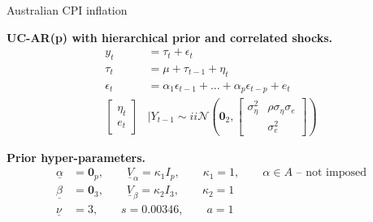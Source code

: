 \documentclass[notes,blackandwhite,mathsans,usenames,dvipsnames]{beamer}
\begin{document}
\begin{frame}{Australian CPI inflation}

\bigskip\textbf{UC-AR(p) with hierarchical prior and correlated shocks.}
\begin{align*}
y_t &= \tau_t + \epsilon_t\\[1ex]
\tau_t &= \mu + \tau_{t-1} + \eta_t\\[1ex]
\epsilon_t &= \alpha_1\epsilon_{t-1} + \dots + \alpha_p\epsilon_{t-p} +  e_t\\[2ex]
\begin{bmatrix}\eta_t \\ e_t\end{bmatrix}&\bigg|Y_{t-1} \sim ii\mathcal{N}\left(\mathbf{0}_2, \begin{bmatrix}\sigma_\eta^2 & \rho\sigma_\eta\sigma_e \\  & \sigma_e^2\end{bmatrix} \right)
\end{align*}

\smallskip\textbf{Prior hyper-parameters.}
\begin{align*}
\underline\alpha &= \mathbf{0}_p,  \qquad\underline{V}_\alpha = \kappa_1I_p, \qquad\kappa_1=1, \qquad \alpha\in A\text{  -- not imposed}\\
\underline\beta &= \mathbf{0}_3,  \qquad\underline{V}_\beta = \kappa_2I_3, \qquad\kappa_2=1\\
\underline\nu &=3, \qquad s= 0.00346 , \qquad a= 1
\end{align*}

\end{frame}
\end{document}
